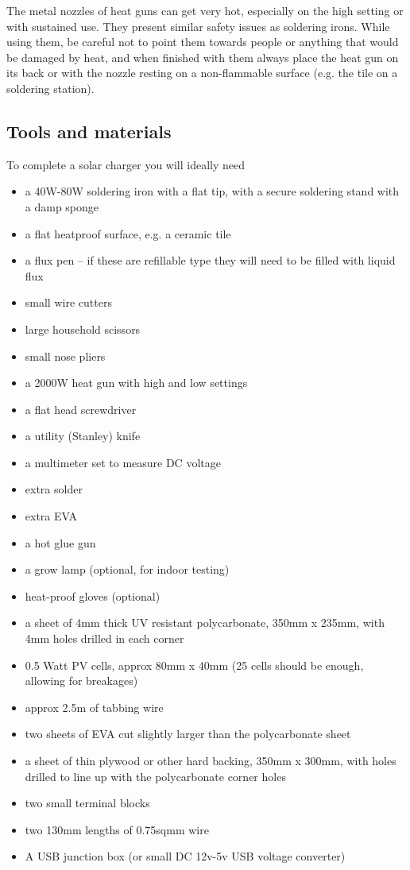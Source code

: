\documentclass{article}
\theoremstyle{definition}
\theoremstyle{definition}
\theoremstyle{remark}
\begin{document}
    The metal nozzles of heat guns can get very hot, especially on the high setting or with sustained use. They present similar safety issues as soldering irons. While using them, be careful not to point them towards people or anything that would be damaged by heat, and when finished with them always place the heat gun on its back or with the nozzle resting on a non-flammable surface (e.g. the tile on a soldering station).
  

  \subsection{Tools and materials} %
  \label{sub:tools_and_materials}

    To complete a solar charger you will ideally need

    \begin{itemize}
      \item a 40W-80W soldering iron with a flat tip, with a secure soldering stand with a damp sponge 
      \item a flat heatproof surface, e.g. a ceramic tile
      \item a flux pen – if these are refillable type they will need to be filled with liquid flux
      \item small wire cutters
      \item large household scissors
      \item small nose pliers
      \item a 2000W heat gun with high and low settings
      \item a flat head screwdriver
      \item a utility (Stanley) knife
      \item a multimeter set to measure DC voltage
      \item extra solder
      \item extra EVA
      \item a hot glue gun
      \item a grow lamp (optional, for indoor testing)
      \item heat-proof gloves (optional)
      \item a sheet of 4mm thick UV resistant polycarbonate, 350mm x 235mm, with 4mm holes drilled in each corner
      \item 0.5 Watt PV cells, approx 80mm x 40mm (25 cells should be enough, allowing for breakages)
      \item approx 2.5m of tabbing wire
      \item two sheets of EVA cut slightly larger than the polycarbonate sheet
      \item a sheet of thin plywood or other hard backing, 350mm x 300mm, with holes drilled to line up with the polycarbonate corner holes
      \item two small terminal blocks
      \item two 130mm lengths of 0.75sqmm wire
      \item A USB junction box (or small DC 12v-5v USB voltage converter)
    \end{itemize}
\end{document}
